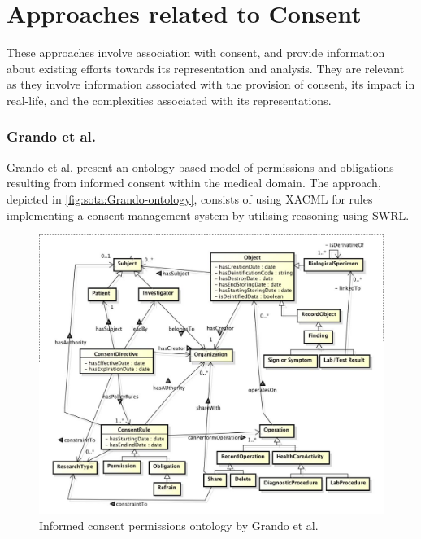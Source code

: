 \section{Approaches related to Consent}\label{sec:sota:consent}
These approaches involve association with consent, and provide information about existing efforts towards its representation and analysis. They are relevant as they involve information associated with the provision of consent, its impact in real-life, and the complexities associated with its representations.

\subsubsection{Grando et al.}
Grando et al. \cite{grando_ontological_2012} present an ontology-based model of permissions and obligations resulting from informed consent within the medical domain. The approach, depicted in \autoref{fig:sota:Grando-ontology}, consists of using XACML for rules implementing a consent management system by utilising reasoning using SWRL.
\begin{figure}[htbp]
    \centering
    \includegraphics[width=0.75\linewidth]{img/Grando_ontology.png}
    \caption{Informed consent permissions ontology by Grando et al. \cite{grando_ontological_2012}}
    \label{fig:sota:Grando-ontology}
\end{figure}

